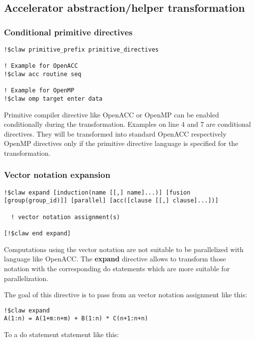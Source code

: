 \subsection{Accelerator abstraction/helper transformation}

\subsubsection{Conditional primitive directives}
\begin{lstlisting}
!$claw primitive_prefix primitive_directives

! Example for OpenACC
!$claw acc routine seq

! Example for OpenMP
!$claw omp target enter data
\end{lstlisting}

Primitive compiler directive like OpenACC or OpenMP can be enabled conditionally
during the transformation. Examples on line 4 and 7 are conditional directives.
They will be transformed into standard OpenACC respectively OpenMP directives
only if the primitive directive language is specified for the transformation.

\subsubsection{Vector notation expansion}
\begin{lstlisting}
!$claw expand [induction(name [[,] name]...)] [fusion [group(group_id)]] [parallel] [acc([clause [[,] clause]...])]

  ! vector notation assignment(s)

[!$claw end expand]
\end{lstlisting}

Computations using the vector notation are not suitable to be parallelized with
language like OpenACC. The \textbf{expand} directive allows to
transform those notation with the corresponding do statements which are more
suitable for parallelization.

The goal of this directive is to pass from an vector notation assignment like
this:

\begin{lstlisting}
!$claw expand
A(1:n) = A(1+m:n+m) + B(1:n) * C(n+1:n+n)
\end{lstlisting}

To a do statement statement like this:

